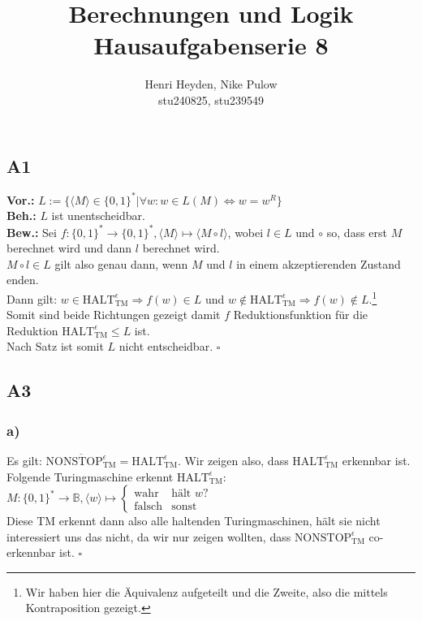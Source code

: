 \documentclass[12pt, a4paper]{article}
\title{Berechnungen und Logik\\Hausaufgabenserie 8}
\author{Henri Heyden, Nike Pulow \\ \small stu240825, stu239549}
\date{}
\newcommand*{\qed}{\null\nobreak\hfill\ensuremath{\square}}
\newcommand*{\gap}{\text{ }}
\newcommand*{\vor}{\textbf{Vor.:} \gap}
\newcommand*{\beh}{\textbf{Beh.:} \gap}
\newcommand*{\bew}{\textbf{Bew.:} \gap}
\newcommand{\HALT}{\text{HALT}_\text{TM}^\epsilon}
\newcommand{\STOPe}{\text{NONSTOP}_\text{TM}^\epsilon}
\begin{document}
\maketitle

\onehalfspacing
\vspace*{-2cm}
\subsection*{A1}
\vor \(L := \{\langle M \rangle \in \{0,1\}^* | \forall w : w \in L(M) \Leftrightarrow w = w^R\}\) \\
\beh \(L\) ist unentscheidbar. \\
\bew Sei \(f : \{0,1\}^* \rightarrow \{0,1\}^*, \langle M \rangle \mapsto \langle M \circ l \rangle\), wobei \(l \in L\) und \(\circ\) so, dass erst \(M\) berechnet wird und dann \(l\) berechnet wird.\\
\(M \circ l \in L\) gilt also genau dann, wenn \(M\) und \(l\) in einem akzeptierenden Zustand enden. \\
Dann gilt: \(w \in \HALT \Rightarrow f(w) \in L\) und \(w \not\in \HALT \Rightarrow f(w) \not\in L\).\footnote[1]{Wir haben hier die Äquivalenz aufgeteilt und die Zweite, also die  mittels Kontraposition gezeigt.} \\
Somit sind beide Richtungen gezeigt damit \(f\) Reduktionsfunktion für die Reduktion \(\HALT \le L\) ist. \\
Nach Satz  ist somit \(L\) nicht entscheidbar. \qed
\subsection*{A3}
\subsubsection*{a)}
Es gilt: \(\overline{\STOPe} = \HALT\). Wir zeigen also, dass \(\HALT\) erkennbar ist. \\
Folgende Turingmaschine erkennt \(\HALT\):\\
\(M : \{0,1\}^* \rightarrow \mathbb B, \langle w \rangle \mapsto \begin{cases}
    \text{wahr} & \text{hält } w \text{?} \\
    \text{falsch} & \text{sonst}
\end{cases}\) \\
Diese TM erkennt dann also alle haltenden Turingmaschinen, hält sie nicht interessiert uns das nicht, da wir nur zeigen wollten, dass \(\STOPe\) co-erkennbar ist. \qed \pagebreak
\end{document}
